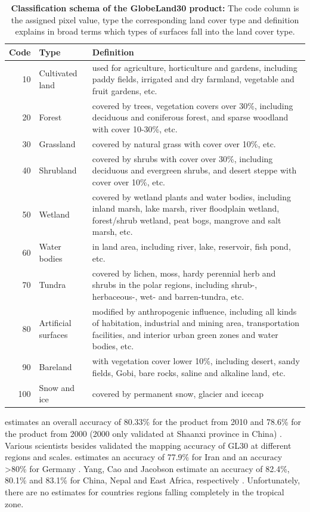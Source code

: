 			\begin{table}[ht]
				\centering
				\caption[Classification schema of the GlobeLand30 product]{\textbf{Classification schema of the GlobeLand30 product:} The code column is the assigned pixel value, type the corresponding land cover type and definition explains in broad terms which types of surfaces fall into the land cover type.\citep{Chen2017}}
				\label{tab:gl30classes}
				\begin{tabular}{rlp{10.3cm}}
					\hline
					Code & Type & Definition \\\hline
					10 & Cultivated land & used for agriculture, horticulture and gardens, including paddy fields, irrigated and dry farmland, vegetable and fruit gardens, etc. \\
					20 & Forest & covered by trees, vegetation covers over 30\%, including deciduous and coniferous forest, and sparse woodland with cover 10-30\%, etc. \\
					30 & Grassland & covered by natural grass with cover over 10\%, etc.\\
					40 & Shrubland & covered by shrubs with cover over 30\%, including deciduous and evergreen shrubs, and desert steppe with cover over 10\%, etc.\\
					50 & Wetland & covered by wetland plants and water bodies, including inland marsh, lake marsh, river floodplain wetland, forest/shrub wetland, peat bogs, mangrove and salt marsh, etc.\\
					60 & Water bodies & in land area, including river, lake, reservoir, fish pond, etc.\\
					70 & Tundra & covered by lichen, moss, hardy perennial herb and shrubs in the polar regions, including shrub-, herbaceous-, wet- and barren-tundra, etc.\\
					80 & Artificial surfaces & modified by anthropogenic influence, including all kinds of habitation, industrial and mining area, transportation facilities, and interior urban green zones and water bodies, etc.\\
					90 & Bareland & with vegetation cover lower 10\%, including desert, sandy fields, Gobi, bare rocks, saline and alkaline land, etc.\\
					100 & Snow and ice & covered by permanent snow, glacier and icecap\\\hline
				\end{tabular}
			\end{table}

			\citeauthor{Chen2015} estimates an overall accuracy of 80.33\% for the product from 2010 and 78.6\% for the product from 2000 (2000 only validated at Shaanxi province in China) \citep{Chen2015}. Various scientists besides \citeauthor{Chen2015} validated the mapping accuracy of \ac{GL30} at different regions and scales. \citeauthor{Arsanjani2016} estimates an accuracy of 77.9\% for Iran and an accuracy >80\% for Germany \citep{Arsanjani2016a,Arsanjani2016}. Yang, Cao and Jacobson estimate an accuracy of 82.4\%, 80.1\% and 83.1\% for China, Nepal and East Africa, respectively . Unfortunately, there are no estimates for countries regions falling completely in the tropical zone.

